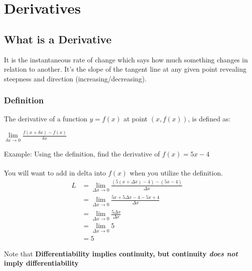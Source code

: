\chapter{Derivatives}

\section{What is a Derivative}
It is the instantaneous rate of change which says how much something changes in relation to another. It's the slope of the tangent line at any given point revealing steepness and direction (increasing/decreasing). 

\subsection{Definition}
The derivative of a function $y = f(x)$ at point $(x, f(x))$, is defined as:
\begin{center}
  $\lim\limits_{\delta x \to 0} \frac{f(x + \delta x) - f(x)}{\delta x}$
\end{center}

Example: Using the definition, find the derivative of $f(x) = 5x - 4$\\
\\
You will want to add in delta into $f(x)$ when you utilize the definition.
\\
\begin{equation*}
  \begin{aligned}
    L &= \lim_{\Delta x \to 0} \frac{(5(x + \Delta x) - 4) - (5x - 4)}{\Delta x} \\
      &= \lim_{\Delta x \to 0} \frac{5x + 5\Delta x - 4 - 5x + 4}{\Delta x} \\
      &= \lim_{\Delta x \to 0} \frac{5\Delta x}{\Delta x} \\
      &= \lim_{\Delta x \to 0} 5 \\
      &= 5
  \end{aligned}
\end{equation*}

Note that \textbf{Differentiability implies continuity, but continuity \textit{does not} imply differentiability} 

